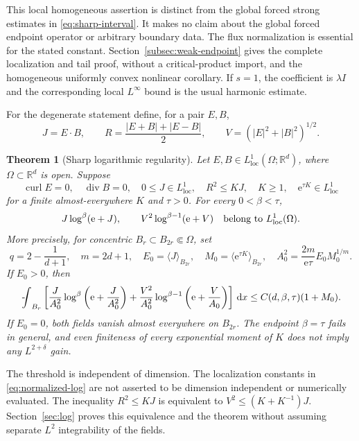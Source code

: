 \documentclass[11pt,a4paper]{article}
\numberwithin{equation}{section}
\newtheorem{theorem}{Theorem}[section]
\theoremstyle{definition}
\theoremstyle{remark}\newtheorem{remark}[theorem]{Remark}
\DeclareMathOperator{\diver}{div}
\DeclareMathOperator{\curl}{curl}
\newcommand{\R}{\mathbb R}
\newcommand{\ee}{\mathrm e}
\newcommand{\Id}{I}
\newcommand{\dd}{\,\mathrm dx}
\newcommand{\mean}[2]{\langle #1\rangle_{#2}}
\newcommand{\loc}{\mathrm{loc}}
\newcommand{\fint}{\mathop{\rlap{\kern.18em-}\int}\nolimits}
\begin{document}
This local homogeneous assertion is distinct from the global forced
strong estimates in \eqref{eq:sharp-interval}. It makes no claim
about the global forced endpoint operator or arbitrary boundary data.
The flux normalization is essential for the stated constant.
Section~\ref{subsec:weak-endpoint} gives the complete localization
and tail proof, without a critical-product import, and the
homogeneous uniformly convex nonlinear corollary.
If \(s=1\), the coefficient is \(\lambda\Id\) and the
corresponding local \(L^\infty\) bound is the usual harmonic estimate.

For the degenerate statement define, for a pair \(E,B\),
\begin{equation}\label{eq:distortion-notation}
 J=E\cdot B,\qquad
 R=\frac{|E+B|+|E-B|}{2},\qquad
 V=(|E|^2+|B|^2)^{1/2}.
\end{equation}

\begin{theorem}[Sharp logarithmic regularity]\label{thm:main-log}
Let \(E,B\in L^1_{\loc}(\Omega;\R^d)\), where \(\Omega\subset\R^d\) is open.
Suppose
\[
 \curl E=0,\quad \diver B=0,\quad
 0\leq J\in L^1_{\loc},\quad R^2\leq KJ,\quad
 K\geq1,\quad \ee^{\tau K}\in L^1_{\loc}
\]
for a finite almost-everywhere \(K\) and \(\tau>0\).
For every \(0<\beta<\tau\),
\begin{equation}\label{eq:log-conclusions}
 J\log^\beta(\ee+J),\qquad
 V^2\log^{\beta-1}(\ee+V)\quad\hbox{belong to }L^1_{\loc}(\Omega).
\end{equation}
More precisely, for concentric \(B_r\subset B_{2r}\Subset\Omega\), set
\[
 q=2-\frac1{d+1},\quad m=2d+1,\quad
 E_0=\mean J{B_{2r}},\quad M_0=\mean{\ee^{\tau K}}{B_{2r}},
 \quad
 A_0^2=\frac{2m}{\ee\tau}E_0M_0^{1/m}.
\]
If \(E_0>0\), then
\begin{equation}\label{eq:normalized-log}
 \fint_{B_r}\left[
 \frac J{A_0^2}\log^\beta\left(\ee+\frac J{A_0^2}\right)
 +\frac{V^2}{A_0^2}
 \log^{\beta-1}\left(\ee+\frac V{A_0}\right)\right]\dd
 \leq C(d,\beta,\tau)(1+M_0).
\end{equation}
If \(E_0=0\), both fields vanish almost everywhere on \(B_{2r}\).
The endpoint \(\beta=\tau\) fails in general, and even finiteness of every
exponential moment of \(K\) does not imply any \(L^{2+\delta}\) gain.
\end{theorem}

The threshold is independent of dimension. The localization constants in
\eqref{eq:normalized-log} are not asserted to be dimension independent or
numerically evaluated. The inequality \(R^2\leq KJ\) is equivalent to
\(V^2\leq(K+K^{-1})J\). Section~\ref{sec:log} proves this equivalence and
the theorem without assuming separate \(L^2\) integrability of the fields.
\end{document}
